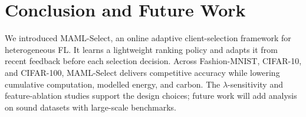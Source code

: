 \documentclass[journal]{IEEEtran}
\newcommand{\revision}[1]{#1}
\begin{document}
\FloatBarrier
\section{Conclusion and Future Work}
\revision{We introduced MAML-Select, an online adaptive client-selection framework for heterogeneous FL. It learns a lightweight ranking policy and adapts it from recent feedback before each selection decision. Across Fashion-MNIST, CIFAR-10, and CIFAR-100, MAML-Select delivers competitive accuracy while lowering cumulative computation, modelled energy, and carbon. The $\lambda$-sensitivity and feature-ablation studies support the design choices; future work will add analysis on sound datasets with large-scale benchmarks.}

\vspace{-1mm}
{\scriptsize


}
\end{document}
